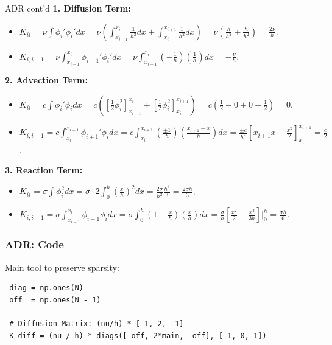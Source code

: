 \documentclass[aspectratio=169]{beamer}
\begin{document}
\begin{frame}{ADR cont'd}
    \textbf{1. Diffusion Term:}
    \begin{itemize}
        \item $K_{ii} = \nu \int \phi_i' \phi_i' dx = \nu \left( \int_{x_{i-1}}^{x_i} \frac{1}{h^2} dx + \int_{x_i}^{x_{i+1}} \frac{1}{h^2} dx \right) = \nu \left( \frac{h}{h^2} + \frac{h}{h^2} \right) = \frac{2\nu}{h}$.
        \item $K_{i, i-1} = \nu \int_{x_{i-1}}^{x_i} \phi_{i-1}' \phi_i' dx = \nu \int_{x_{i-1}}^{x_i} (-\frac{1}{h})(\frac{1}{h}) dx = -\frac{\nu}{h}$.
    \end{itemize}

    \vspace{0.2cm}
    \textbf{2. Advection Term:}
    \begin{itemize}
        \item $K_{ii} = c \int \phi_i' \phi_i dx = c \left( \left[\frac{1}{2}\phi_i^2\right]_{x_{i-1}}^{x_i} + \left[\frac{1}{2}\phi_i^2\right]_{x_i}^{x_{i+1}} \right) = c(\frac{1}{2} - 0 + 0 - \frac{1}{2}) = 0$.
        \item $K_{i, i\pm 1} = c \int_{x_i}^{x_{i+1}} \phi_{i+1}' \phi_i dx = c \int_{x_i}^{x_{i+1}} (\frac{\pm 1}{h})(\frac{x_{i+1}-x}{h}) dx = \frac{\pm c}{h^2} \left[x_{i+1}x - \frac{x^2}{2}\right]_{x_i}^{x_{i+1}} = \frac{c}{2}$.
    \end{itemize}

    \vspace{0.2cm}
    \textbf{3. Reaction Term:}
    \begin{itemize}
        \item $K_{ii} = \sigma \int \phi_i^2 dx = \sigma \cdot 2 \int_0^h (\frac{x}{h})^2 dx = \frac{2\sigma}{h^2} \frac{h^3}{3} = \frac{2\sigma h}{3}$.
        \item $K_{i, i-1} = \sigma \int_{x_{i-1}}^{x_i} \phi_{i-1} \phi_i dx = \sigma \int_0^h (1-\frac{x}{h})(\frac{x}{h}) dx = \frac{\sigma}{h} [ \frac{x^2}{2} - \frac{x^3}{3h} ]|_0^h = \frac{\sigma h}{6}$.
    \end{itemize}
\end{frame}

\begin{frame}[fragile]\frametitle{ADR: Code}

    \vspace{0.5cm}
    Main tool to preserve sparsity: 
    \vspace{0.5cm}

    \hrulefill
    \begin{verbatim}
 diag = np.ones(N)
 off  = np.ones(N - 1)

 # Diffusion Matrix: (nu/h) * [-1, 2, -1]
 K_diff = (nu / h) * diags([-off, 2*main, -off], [-1, 0, 1])
    \end{verbatim}
    \hrulefill

\end{frame}

\begin{frame}
    \titlepage
\end{frame}
\end{document}
